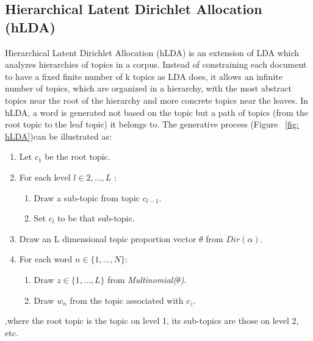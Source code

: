 \documentclass[DIV=calc, paper=letter, fontsize=10pt, twocolumn]{scrartcl}	 %
\begin{document}
\subsection*{Hierarchical Latent Dirichlet Allocation (hLDA)}
Hierarchical Latent Dirichlet Allocation (hLDA) \cite{2} is an extension of LDA which analyzes hierarchies of topics in a corpus. Instead of constraining each document to have a fixed finite number of k topics as LDA does, it allows an infinite number of topics, which are organized in a hierarchy, with the most abstract topics near the root of the hierarchy and more concrete topics near the leaves. In hLDA, a word is generated not based on the topic but a path of topics (from the root topic to the leaf topic) it belongs to.\newline
The generative process (Figure ~\ref{fig: hLDA})can be illustrated as:
\begin{enumerate}
  \item Let $c_1$ be the root topic.
  \item For each level $l \in 2,\ldots, L$ :
  	\begin{enumerate}
		\item Draw a sub-topic from topic $c_{l - 1}$.
		\item Set $c_l$ to be that sub-topic.
	\end{enumerate}

  \item Draw an L dimensional topic proportion vector $\theta$ from $Dir(\alpha)$.
  \item For each word $n \in \{ 1, \ldots, N \}$:
  	\begin{enumerate}
  	  	\item Draw $z \in \{ 1, \ldots, L \}$ from {\it Multinomial($\theta$)}.
    		\item Draw $w_n$ from the topic associated with $c_z$.
  	\end{enumerate}
\end{enumerate}
,where the root topic is the topic on level 1, its sub-topics are those on level 2, etc.
\end{document}
